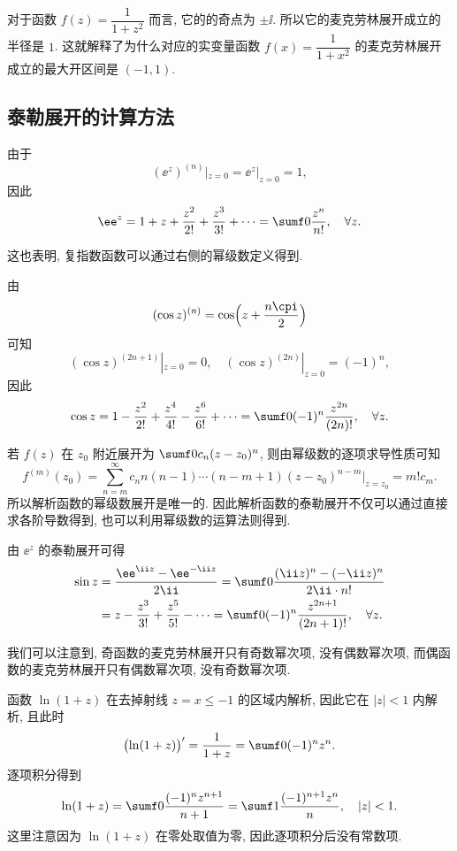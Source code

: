 对于函数 $f(z)=\dfrac1{1+z^2}$ 而言, 它的的奇点为 $\pm\ii$.
所以它的麦克劳林展开成立的半径是 $1$.
这就解释了为什么对应的实变量函数 $f(x)=\dfrac1{1+x^2}$ 的麦克劳林展开成立的最大开区间是 $(-1,1)$.


\subsection{泰勒展开的计算方法}

\begin{example}
  \label{exam:exp-taylor-expansion}
  由于
  \[
    (\ee^z)^{(n)}|_{z=0}=\ee^z|_{z=0}=1,
  \]
  因此
  \[
     \ee^z
    =1+z+\frac{z^2}{2!}+\frac{z^3}{3!}+\cdots
    =\sumf0 \frac{z^n}{n!},
      \quad\forall z.
  \]
\end{example}

这也表明, 复指数函数可以通过右侧的幂级数定义得到.

\begin{example}
  由
  \[
    (\cos z)^{(n)}=\cos\Bigl(z+\dfrac{n\cpi}2\Bigr)
  \]
  可知
  \[
    (\cos z)^{(2n+1)}|_{z=0}=0,\quad 
    (\cos z)^{(2n)}|_{z=0}=(-1)^n,
  \]
  因此
  \[
     \cos z
    =1-\frac{z^2}{2!}+\frac{z^4}{4!}-\frac{z^6}{6!}+\cdots
    =\sumf0 (-1)^n\frac{z^{2n}}{(2n)!},
      \quad\forall z.
  \]
\end{example}

若 $f(z)$ 在 $z_0$ 附近展开为 $\sumf0 c_n(z-z_0)^n$,
则由幂级数的逐项求导性质可知
\[
   f^{(m)}(z_0)
  =\sum_{n=m}^\infty c_n n(n-1)\cdots(n-m+1)(z-z_0)^{n-m}
    \Big|_{z=z_0}
  =m!c_m.
\]
所以\alert{解析函数的幂级数展开是唯一的}.
因此解析函数的泰勒展开不仅可以通过直接求各阶导数得到, 也可以\alert{利用幂级数的运算法则得到}.

\begin{example}
  由 $\ee^z$ 的泰勒展开可得
  \begin{align*}
     \sin z&
    =\frac{\ee^{\ii z}-\ee^{-\ii z}}{2\ii}
    =\sumf0 \frac{(\ii z)^n-(-\ii z)^n}{2\ii\cdot n!}\\&
    =z-\frac{z^3}{3!}+\frac{z^5}{5!}-\cdots
    =\sumf0 (-1)^n\frac{z^{2n+1}}{(2n+1)!},\quad\forall z.
  \end{align*}
\end{example}

我们可以注意到, 奇函数的麦克劳林展开只有奇数幂次项, 没有偶数幂次项, 而偶函数的麦克劳林展开只有偶数幂次项, 没有奇数幂次项.

\begin{example}
  函数 $\ln(1+z)$ 在去掉射线 $z=x\le-1$ 的区域内解析, 因此它在 $|z|<1$ 内解析, 且此时
  \[
     \bigl(\ln(1+z)\bigr)'
    =\frac1{1+z}
    =\sumf0 (-1)^nz^n.
  \]
  逐项积分得到
  \[
     \ln(1+z)
    =\sumf0 \frac{(-1)^nz^{n+1}}{n+1}
    =\sumf1 \frac{(-1)^{n+1}z^n}{n},\quad|z|<1.
  \]
  这里注意因为 $\ln(1+z)$ 在零处取值为零, 因此逐项积分后没有常数项.
\end{example}

